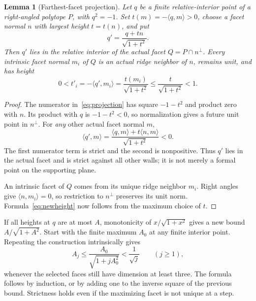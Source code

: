 \documentclass[11pt]{article}
\newtheorem{lemma}[theorem]{Lemma}
\theoremstyle{remark}
\newcommand{\ip}[2]{\langle #1,#2\rangle}
\begin{document}
\begin{lemma}[Farthest-facet projection]\label{lem:projection}
Let $q$ be a finite relative-interior point of a right-angled polytope
$P$, with $q^2=-1$. Set $t(m)=-\ip{q}{m}>0$, choose a facet normal
$n$ with largest height $t=t(n)$, and put
\begin{equation}\label{eq:projection}
 q'=\frac{q+tn}{\sqrt{1+t^2}}.
\end{equation}
Then $q'$ lies in the relative interior of the actual facet
$Q=P\cap n^\perp$. Every intrinsic facet normal $m_i$ of $Q$ is
an actual ridge neighbor of $n$, remains unit, and has height
\begin{equation}\label{eq:newheight}
 0<t'_i=-\ip{q'}{m_i}
       =\frac{t(m_i)}{\sqrt{1+t^2}}
       \le\frac{t}{\sqrt{1+t^2}}<1.
\end{equation}
\end{lemma}
\begin{proof}
The numerator in~\eqref{eq:projection} has square $-1-t^2$ and
product zero with $n$. Its product with $q$ is $-1-t^2<0$, so
normalization gives a future unit point in $n^\perp$. For \emph{any}
other actual facet normal $m$,
\begin{equation}\label{eq:allwall}
 \ip{q'}{m}=\frac{\ip{q}{m}+t\ip{n}{m}}{\sqrt{1+t^2}}<0.
\end{equation}
The first numerator term is strict and the second is nonpositive.
Thus $q'$ lies in the actual facet and is strict against all other
walls; it is not merely a formal point on the supporting plane.

An intrinsic facet of $Q$ comes from its unique ridge neighbor $m_i$.
Right angles give $\ip{n}{m_i}=0$, so restriction to $n^\perp$
preserves its unit norm. Formula~\eqref{eq:newheight} now follows
from the maximum choice of $t$.
\end{proof}

If all heights at $q$ are at most $A$, monotonicity of
$x/\sqrt{1+x^2}$ gives a new bound
$A/\sqrt{1+A^2}$. Start with the finite maximum $A_0$ at any finite
interior point. Repeating the construction intrinsically gives
\begin{equation}\label{eq:iterate}
 A_j\le\frac{A_0}{\sqrt{1+jA_0^2}}<\frac1{\sqrt j}
 \qquad(j\ge1),
\end{equation}
whenever the selected faces still have dimension at least three.
The formula follows by induction, or by adding one to the inverse
square of the previous bound. Strictness holds even if the maximizing
facet is not unique at a step.
\end{document}
